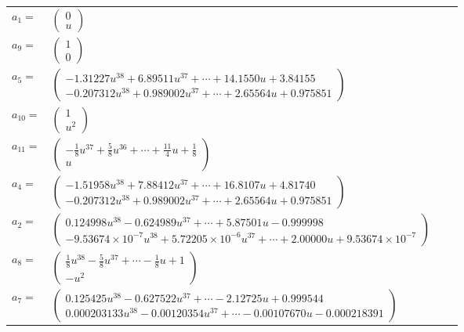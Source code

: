 \documentclass[1p]{elsarticle_modified}
\theoremstyle{definition}
\begin{document}
\begin{tabular}{m{7pt} m{180pt} m{7pt} m{180pt} }
\flushright $a_{1}=$&$\begin{pmatrix}0\\u\end{pmatrix}$ \\
\flushright $a_{9}=$&$\begin{pmatrix}1\\0\end{pmatrix}$ \\
\flushright $a_{5}=$&$\begin{pmatrix}-1.31227 u^{38}+6.89511 u^{37}+\cdots+14.1550 u+3.84155\\-0.207312 u^{38}+0.989002 u^{37}+\cdots+2.65564 u+0.975851\end{pmatrix}$ \\
\flushright $a_{10}=$&$\begin{pmatrix}1\\u^2\end{pmatrix}$ \\
\flushright $a_{11}=$&$\begin{pmatrix}-\frac{1}{8} u^{37}+\frac{5}{8} u^{36}+\cdots+\frac{11}{4} u+\frac{1}{8}\\u\end{pmatrix}$ \\
\flushright $a_{4}=$&$\begin{pmatrix}-1.51958 u^{38}+7.88412 u^{37}+\cdots+16.8107 u+4.81740\\-0.207312 u^{38}+0.989002 u^{37}+\cdots+2.65564 u+0.975851\end{pmatrix}$ \\
\flushright $a_{2}=$&$\begin{pmatrix}0.124998 u^{38}-0.624989 u^{37}+\cdots+5.87501 u-0.999998\\-9.53674\times10^{-7} u^{38}+5.72205\times10^{-6} u^{37}+\cdots+2.00000 u+9.53674\times10^{-7}\end{pmatrix}$ \\
\flushright $a_{8}=$&$\begin{pmatrix}\frac{1}{8} u^{38}-\frac{5}{8} u^{37}+\cdots-\frac{1}{8} u+1\\- u^2\end{pmatrix}$ \\
\flushright $a_{7}=$&$\begin{pmatrix}0.125425 u^{38}-0.627522 u^{37}+\cdots-2.12725 u+0.999544\\0.000203133 u^{38}-0.00120354 u^{37}+\cdots-0.00107670 u-0.000218391\end{pmatrix}$ \\

\end{tabular}
\end{document}
